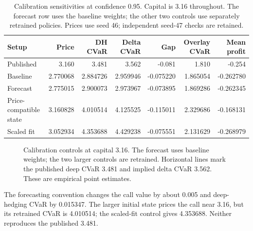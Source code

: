 \documentclass[11pt,a4paper]{article}
\theoremstyle{remark}
\begin{document}
\begin{table}[htbp]
\centering\footnotesize
\caption{Calibration sensitivities at confidence 0.95. Capital is 3.16 throughout. The forecast row uses the baseline weights; the other two controls use separately retrained policies. Prices use seed 46; independent seed-47 checks are retained.}
\begin{tabular}{@{}lrrrrrr@{}}
\toprule
Setup & Price & DH CVaR & Delta CVaR & Gap & Overlay CVaR & Mean profit\\
\midrule
Published & 3.160 & 3.481 & 3.562 & -0.081 & 1.810 & -0.254\\
Baseline & 2.770068 & 2.884726 & 2.959946 & -0.075220 & 1.865054 & -0.262780\\
Forecast & 2.775015 & 2.900073 & 2.973967 & -0.073895 & 1.869286 & -0.262345\\
Price-compatible state & 3.160828 & 4.010514 & 4.125525 & -0.115011 & 2.329686 & -0.168131\\
Scaled fit & 3.052934 & 4.353688 & 4.429238 & -0.075551 & 2.131629 & -0.268979\\
\bottomrule
\end{tabular}
\end{table}
\begin{figure}[htbp]
\centering
{}
\caption{Calibration controls at capital 3.16. The forecast uses baseline weights; the two larger controls are retrained. Horizontal lines mark the published deep CVaR 3.481 and implied delta CVaR 3.562. These are empirical point estimates.}
\label{fig:calibrationrisk}
\end{figure}
The forecasting convention changes the call value by about 0.005 and deep-hedging CVaR by 0.015347. The larger initial state prices the call near 3.16, but its retrained CVaR is 4.010514; the scaled-fit control gives 4.353688. Neither reproduces the published 3.481.
\end{document}
